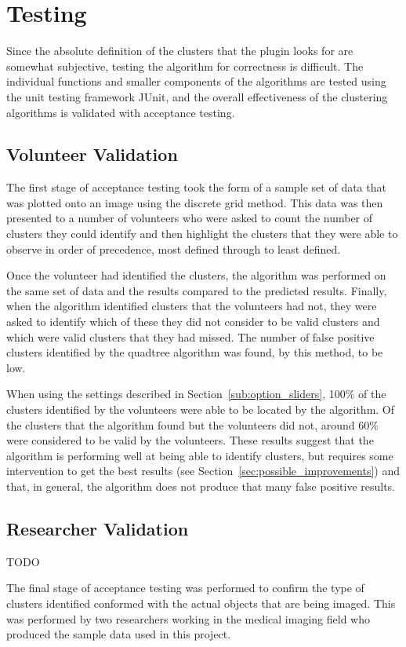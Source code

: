 
\section{Testing}
\label{sec:testing}

Since the absolute definition of the clusters that the plugin looks for are
somewhat subjective, testing the algorithm for correctness is difficult. The
individual functions and smaller components of the algorithms are tested using
the unit testing framework JUnit\cite{tahchiev2010junit}, and the overall
effectiveness of the clustering algorithms is validated with acceptance
testing.

\subsection{Volunteer Validation}
\label{sub:volunteer_validation}

The first stage of acceptance testing took the form of a sample set of data
that was plotted onto an image using the discrete grid method. This data was
then presented to a number of volunteers who were asked to count the number of
clusters they could identify and then highlight the clusters that they were
able to observe in order of precedence, most defined through to least defined.

Once the volunteer had identified the clusters, the algorithm was performed on
the same set of data and the results compared to the predicted results.
Finally, when the algorithm identified clusters that the volunteers had not,
they were asked to identify which of these they did not consider to be valid
clusters and which were valid clusters that they had missed. The number of
false positive clusters identified by the quadtree algorithm was found, by this
method, to be low.

When using the settings described in Section~\ref{sub:option_sliders}, 100\% of
the clusters identified by the volunteers were able to be located by the
algorithm. Of the clusters that the algorithm found but the volunteers did not,
around 60\% were considered to be valid by the volunteers. These results
suggest that the algorithm is performing well at being able to identify
clusters, but requires some intervention to get the best results (see
Section~\ref{sec:possible_improvements}) and that, in general, the algorithm
does not produce that many false positive results.

\subsection{Researcher Validation}
\label{sub:researcher_validation}

TODO

The final stage of acceptance testing was performed to confirm the type of
clusters identified conformed with the actual objects that are being imaged.
This was performed by two researchers working in the medical imaging field who
produced the sample data used in this project.
